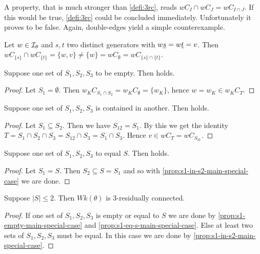 A property, that is much stronger than \ref{defi:3rc}, reads $wC_I \cap wC_J = wC_{I \cap J}$. If this would be true, \ref{defi:3rc} could be concluded immediately. Unfortunately it proves to be false. Again, double-edges yield a simple counterexample.

\begin{exam}
	Let $w \in \mathcal{I}_{\theta}$ and $s,t$ two distinct generators with $w \underline{s} = w \underline{t} = v$. Then $wC_{\{s\}} \cap wC_{\{t\}} = \{w,v\} \neq \{w\} = wC_{\emptyset} = wC_{\{s\} \cap \{t\}}$.
\end{exam}

\begin{prop}
	Suppose one set of $S_1,S_2,S_3$ to be empty. Then  holds.

	\begin{proof}
		Let $S_1 = \emptyset$. Then $w_K C_{S_1 \cap S_2} = w_K C_\emptyset = \{ w_K \}$, hence $w = w_K \in w_K C_T$.
	\end{proof}
\end{prop}

\begin{prop}
	Suppose one set of $S_1,S_2,S_3$ is contained in another. Then  holds.

	\begin{proof}
		Let $S_1 \subseteq S_2$. Then we have $S_{12} = S_1$. By this we get the identity $T = S_1 \cap S_2 \cap S_3 = S_{12} \cap S_3 = S_1 \cap S_3$. Hence $v \in w C_T = w C_{S_{31}}$.
	\end{proof}
\end{prop}

\begin{coro}
	Suppose one set of $S_1,S_2,S_3$ to equal $S$. Then  holds.

	\begin{proof}
		Let $S_1 = S$. Then $S_2 \subseteq S = S_1$ and so with \ref{prop:s1-in-s2-main-special-case} we are done.
	\end{proof}
\end{coro}

\begin{coro}
	Suppose $|S| \leq 2$. Then $Wk(\theta)$ is 3-residually connected.

	\begin{proof}
		If one set of $S_1,S_2,S_3$ is empty or equal to $S$ we are done by \ref{prop:s1-empty-main-special-case} and \ref{prop:s1-eq-s-main-special-case}. Else at least two sets of $S_1,S_2,S_3$ must be equal. In this case we are done by \ref{prop:s1-in-s2-main-special-case}.
	\end{proof}
\end{coro}

